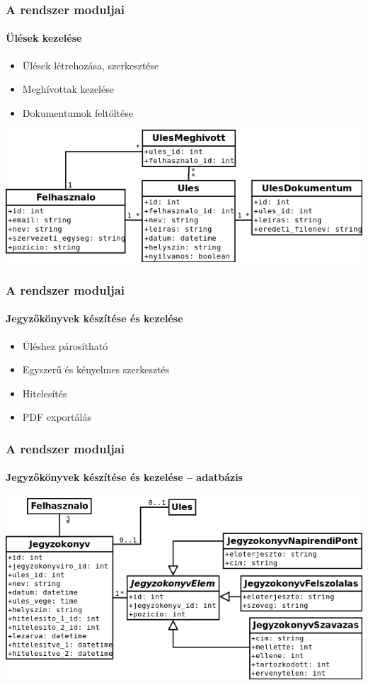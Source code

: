 \documentclass[12pt]{beamer}
\begin{document}
\begin{frame}
    \frametitle{A rendszer moduljai}
    \framesubtitle{Ülések kezelése}
    
    \begin{itemize}
        \item Ülések létrehozása, szerkesztése
        \item Meghívottak kezelése
        \item Dokumentumok feltöltése
    \end{itemize}
    
    \includegraphics[width=\textwidth,center]{ules_db.png}
\end{frame}

\begin{frame}
    \frametitle{A rendszer moduljai}
    \framesubtitle{Jegyzőkönyvek készítése és kezelése}
    
    \Large
    \begin{itemize}
        \item Üléshez párosítható
        \item Egyszerű és kényelmes szerkesztés
        \item Hitelesítés
        \item PDF exportálás
    \end{itemize}
\end{frame}

\begin{frame}
    \frametitle{A rendszer moduljai}
    \framesubtitle{Jegyzőkönyvek készítése és kezelése -- adatbázis}
    
    \includegraphics[width=\textwidth,center]{jegyzokonyv_db.png}
\end{frame}
\end{document}
